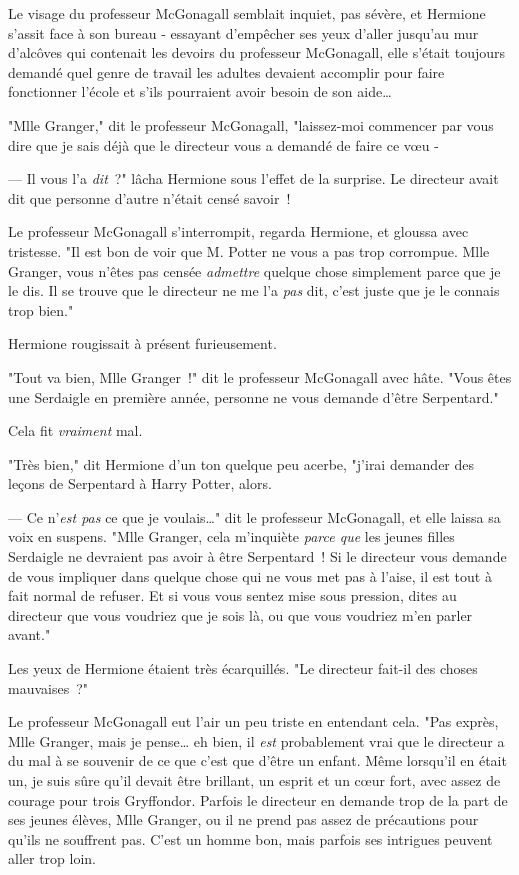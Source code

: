 Le visage du professeur McGonagall semblait inquiet, pas sévère, et Hermione s'assit face à son bureau - essayant d'empêcher ses yeux d'aller jusqu'au mur d'alcôves qui contenait les devoirs du professeur McGonagall, elle s'était toujours demandé quel genre de travail les adultes devaient accomplir pour faire fonctionner l'école et s'ils pourraient avoir besoin de son aide…

"Mlle Granger," dit le professeur McGonagall, "laissez-moi commencer par vous dire que je sais déjà que le directeur vous a demandé de faire ce vœu -

--- Il vous l'a \emph{dit}~?" lâcha Hermione sous l'effet de la surprise. Le directeur avait dit que personne d'autre n'était censé savoir~!

Le professeur McGonagall s'interrompit, regarda Hermione, et gloussa avec tristesse. "Il est bon de voir que M. Potter ne vous a pas trop corrompue. Mlle Granger, vous n'êtes pas censée \emph{admettre} quelque chose simplement parce que je le dis. Il se trouve que le directeur ne me l'a \emph{pas} dit, c'est juste que je le connais trop bien."

Hermione rougissait à présent furieusement.

"Tout va bien, Mlle Granger~!" dit le professeur McGonagall avec hâte. "Vous êtes une Serdaigle en première année, personne ne vous demande d'être Serpentard."

Cela fit \emph{vraiment} mal.

"Très bien," dit Hermione d'un ton quelque peu acerbe, "j'irai demander des leçons de Serpentard à Harry Potter, alors.

--- Ce n'\emph{est pas} ce que je voulais…" dit le professeur McGonagall, et elle laissa sa voix en suspens. "Mlle Granger, cela m'inquiète \emph{parce que} les jeunes filles Serdaigle ne devraient pas avoir à être Serpentard~! Si le directeur vous demande de vous impliquer dans quelque chose qui ne vous met pas à l'aise, il est tout à fait normal de refuser. Et si vous vous sentez mise sous pression, dites au directeur que vous voudriez que je sois là, ou que vous voudriez m'en parler avant."

Les yeux de Hermione étaient très écarquillés. "Le directeur fait-il des choses mauvaises~?"

Le professeur McGonagall eut l'air un peu triste en entendant cela. "Pas exprès, Mlle Granger, mais je pense… eh bien, il \emph{est} probablement vrai que le directeur a du mal à se souvenir de ce que c'est que d'être un enfant. Même lorsqu'il en était un, je suis sûre qu'il devait être brillant, un esprit et un cœur fort, avec assez de courage pour trois Gryffondor. Parfois le directeur en demande trop de la part de ses jeunes élèves, Mlle Granger, ou il ne prend pas assez de précautions pour qu'ils ne souffrent pas. C'est un homme bon, mais parfois ses intrigues peuvent aller trop loin.

